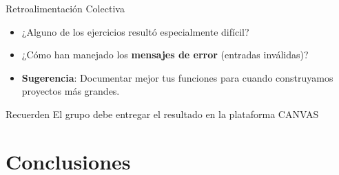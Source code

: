 \documentclass[10pt]{beamer}
\begin{document}

\begin{frame}{Retroalimentación Colectiva}
  \begin{itemize}
    \item ¿Alguno de los ejercicios resultó especialmente difícil?
    \item ¿Cómo han manejado los \textbf{mensajes de error} (entradas inválidas)?
    \item \textbf{Sugerencia}: Documentar mejor tus funciones para cuando construyamos proyectos más grandes.
  \end{itemize}
  \begin{block}{Recuerden}
    El grupo debe entregar el resultado en la plataforma CANVAS
  \end{block}
\end{frame}

\section{Conclusiones}
\end{document}
